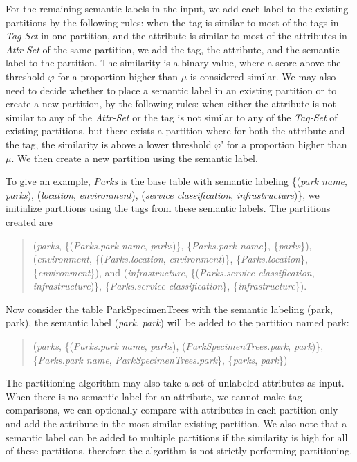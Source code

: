 For the remaining semantic labels in the input, we add each label to the existing partitions by the following rules: when the tag is similar to most of the tags in \textit{Tag-Set} in one partition, and the attribute is similar to most of the attributes in \textit{Attr-Set} of the same partition, we add the tag, the attribute, and the semantic label to the partition. The similarity is a binary value, where a score above the threshold $\varphi$ for a proportion higher than $\mu$ is considered similar. We may also need to decide whether to place a semantic label in an existing partition or to create a new partition, by the following rules: when either the attribute is not similar to any of the \textit{Attr-Set} or the tag is not similar to any of the \textit{Tag-Set} of existing partitions, but there exists a partition where for both the attribute and the tag, the similarity is above a lower threshold $\varphi$' for a proportion higher than $\mu$. We then create a new partition using the semantic label.

To give an example, \textit{Parks} is the base table with semantic labeling \{(\textit{park name}, \textit{parks}), (\textit{location}, \textit{environment}), (\textit{service classification}, \textit{infrastructure})\}, we initialize partitions using the tags from these semantic labels. The partitions created are
\begin{quote}
(\textit{parks}, \{(\textit{Parks.park name}, \textit{parks})\}, \{\textit{Parks.park name}\}, \{\textit{parks}\}),
(\textit{environment}, \{(\textit{Parks.location}, \textit{environment})\}, \{\textit{Parks.location}\}, \{\textit{environment}\}), and
(\textit{infrastructure}, \{(\textit{Parks.service classification}, \textit{infrastructure})\}, \{\textit{Parks.service classification}\}, \{\textit{infrastructure}\}).
\end{quote}

Now consider the table ParkSpecimenTrees with the semantic labeling {(park, park)}, the semantic label (\textit{park}, \textit{park}) will be added to the partition named park:
\begin{quote}
(\textit{parks}, \{(\textit{Parks.park name}, \textit{parks}), (\textit{ParkSpecimenTrees.park}, \textit{park})\}, \{\textit{Parks.park name}, \textit{ParkSpecimenTrees.park}\}, \{\textit{parks}, \textit{park}\})
\end{quote}

The partitioning algorithm may also take a set of unlabeled attributes as input. When there is no semantic label for an attribute, we cannot make tag comparisons, we can optionally compare with attributes in each partition only and add the attribute in the most similar existing partition. We also note that a semantic label can be added to multiple partitions if the similarity is high for all of these partitions, therefore the algorithm is not strictly performing partitioning.
